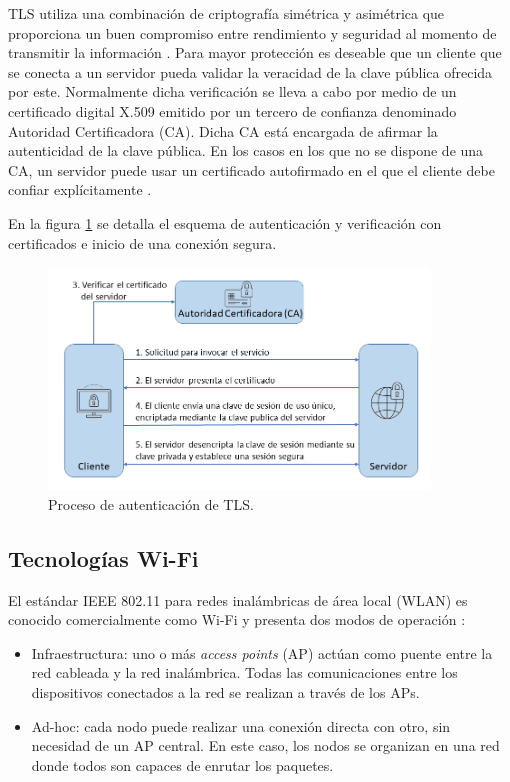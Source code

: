 TLS utiliza una combinación de criptografía simétrica y asimétrica que proporciona un buen compromiso entre rendimiento y seguridad al momento de transmitir la información \citep{tls:2}. Para mayor protección es deseable que un cliente que se conecta a un servidor pueda validar la veracidad de la clave pública ofrecida por este. Normalmente dicha verificación se lleva a cabo por medio de un certificado digital X.509 \citep{x509:1} emitido por un tercero de confianza denominado Autoridad Certificadora (CA). Dicha CA está encargada de  afirmar la autenticidad de la clave pública. En los casos en los que no se dispone de una CA, un servidor puede usar un certificado autofirmado en el que el cliente debe confiar explícitamente \citep{tls:2}.


En la figura \ref{fig:ssl2way} se detalla el esquema de autenticación y verificación con certificados e inicio de una conexión segura.

\begin{figure}[h]
	\centering
	\includegraphics[width=0.9\textwidth]{./Figures/tls.png}
	\caption[Proceso de autenticación de TLS]{Proceso de autenticación de TLS\protect\footnotemark.}
	\label{fig:ssl2way}

\end{figure}

\subsection{Tecnologías Wi-Fi}
\label{sec:Tecnologías Wi-Fi}
El estándar IEEE 802.11 para redes inalámbricas de área local (WLAN) es conocido comercialmente como Wi-Fi y presenta dos modos de operación \citep{wifi}:
\begin{itemize}
\item Infraestructura: uno o más \textit{access points} (AP) actúan como puente entre la red cableada y la red inalámbrica. Todas las comunicaciones entre los dispositivos conectados a la red se realizan a través de los APs. 
\item Ad-hoc: cada nodo puede realizar una conexión directa con otro, sin necesidad de un AP central. En este caso, los nodos se organizan en una red donde todos son capaces de enrutar los paquetes.  
\end{itemize}

